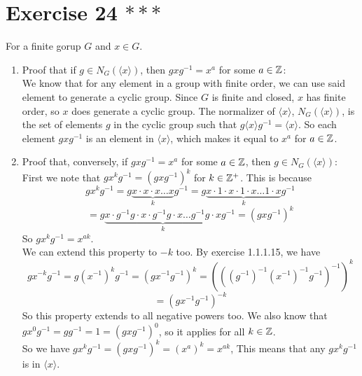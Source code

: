 \documentclass[12pt]{article}
\begin{document}
    \section*{Exercise 24 $***$}
    For a finite gorup $G$ and $x \in G$. \\
    \begin{enumerate}[label=\textbf{\alph*.}]
        \item 
            Proof that if $g \in N_G(\langle x \rangle)$,
            then $gxg^{-1} = x^a$ for some $a \in \mathbb{Z}$: \\
            We know that for any element in a group with finite order,
            we can use said element to generate a cyclic group.
            Since $G$ is finite and closed,
            $x$ has finite order,
            so $x$ does generate a cyclic group.
            The normalizer of $\langle x \rangle$,
            $N_G(\langle x \rangle)$,
            is the set of elements $g$ in the cyclic group
            such that $g\langle x \rangle g^{-1} = \langle x \rangle$.
            So each element $gxg^{-1}$
            is an element in $\langle x \rangle$,
            which makes it equal to $x^a$ for $a \in \mathbb{Z}$.
        \item
            Proof that, conversely, if $gxg^{-1} = x^a$
            for some $a \in \mathbb{Z}$,
            then $g \in N_G(\langle x \rangle)$: \\
            First we note that $gx^kg^{-1} = (gxg^{-1})^k$
            for $k \in \mathbb{Z}^+$.
            This is because
            \[ gx^kg^{-1}
            = g\underbrace{x \cdot x \cdot x \dots x}_{k}g^{-1} 
            = g\underbrace{x \cdot 1 \cdot x \cdot 1 \cdot x 
            \dots 1 \cdot x}_{k}g^{-1}  \]
            \[ = g\underbrace{x \cdot g^{-1}g \cdot x \cdot g^{-1}g \cdot x 
            \dots g^{-1}g \cdot x}_{k}g^{-1} 
            = (gxg^{-1})^k \]
            So $gx^kg^{-1} = x^{ak}$. \\
            We can extend this property to $-k$ too.
            By exercise 1.1.1.15, we have
            \[ gx^{-k}g^{-1} = g(x^{-1})^kg^{-1}
            =  (gx^{-1}g^{-1})^k
            = (((g^{-1})^{-1}(x^{-1})^{-1}g^{-1})^{-1})^k \]
            \[ = (gx^{-1}g^{-1})^{-k} \]
            So this property extends to all negative powers too.
            We also know that $gx^0g^{-1} = gg^{-1} = 1 = (gxg^{-1})^0$,
            so it applies for all $k \in \mathbb{Z}$. \\
            So we have $gx^kg^{-1} = (gxg^{-1})^k = (x^a)^k = x^{ak}$,
            This means that any $gx^kg^{-1}$ is in $\langle x \rangle$.

\end{enumerate}
\end{document}
